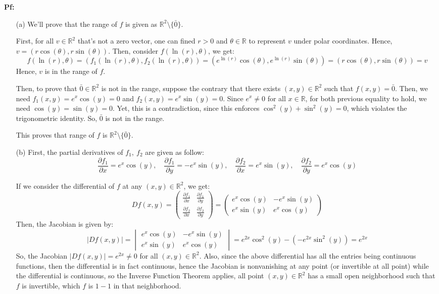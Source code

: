 \documentclass{article}
\begin{document}
\textbf{Pf:}
\begin{itemize}
    \item[(a)] We'll prove that the range of $f$ is given as $\mathbb{R}^2\setminus\{\bar{0}\}$.
    
    First, for all $v\in\mathbb{R}^2$ that's not a zero vector, one can fined $r>0$ and $\theta\in\mathbb{R}$ to represent $v$ under polar coordinates.
    Hence, $v = (r\cos(\theta),r\sin(\theta))$. Then, consider $f(\ln(r),\theta)$, we get:
    $$f(\ln(r),\theta)=\left(f_1(\ln(r),\theta),f_2(\ln(r),\theta)\right) = (e^{\ln(r)}\cos(\theta),e^{\ln(r)}\sin(\theta)) = (r\cos(\theta),r\sin(\theta))=v$$
    Hence, $v$ is in the range of $f$.

    Then, to prove that $\bar{0}\in \mathbb{R}^2$ is not in the range, suppose the contrary that there exists $(x,y)\in\mathbb{R}^2$ such that $f(x,y)=\bar{0}$.
    Then, we need $f_1(x,y)=e^x\cos(y)=0$ and $f_2(x,y)=e^x\sin(y)=0$.
    Since $e^x\neq 0$ for all $x\in\mathbb{R}$, for both previous equality to hold, we need $\cos(y)=\sin(y)=0$. Yet, this is a contradiction, since this enforces $\cos^2(y)+\sin^2(y)=0$,
    which violates the trigonometric identity. So, $\bar{0}$ is not in the range.

    This proves that range of $f$ is $\mathbb{R}^2\setminus\{\bar{0}\}$.

    \hfil

    \item[(b)] First, the partial derivatives of $f_1,\ f_2$ are given as follow:
    $$\frac{\partial f_1}{\partial x} = e^x\cos(y),\quad \frac{\partial f_1}{\partial y}=-e^x\sin(y),\quad \frac{\partial f_2}{\partial x}=e^x\sin(y),\quad \frac{\partial f_2}{\partial y}=e^x\cos(y)$$
    
    If we consider the differential of $f$ at any $(x,y)\in\mathbb{R}^2$, we get:
    $$Df(x,y) = \begin{pmatrix}
        \frac{\partial f_1}{\partial x} & \frac{\partial f_1}{\partial y}\\
        \frac{\partial f_2}{\partial x} & \frac{\partial f_2}{\partial y}
    \end{pmatrix} = \begin{pmatrix}
        e^x\cos(y) & -e^x\sin(y)\\
        e^x\sin(y) & e^x\cos(y)
    \end{pmatrix}$$
    Then, the Jacobian is given by:
    $$|Df(x,y)| = \begin{vmatrix}
        e^x\cos(y) & -e^x\sin(y)\\
        e^x\sin(y) & e^x\cos(y)
    \end{vmatrix} = e^{2x}\cos^2(y) - (-e^{2x}\sin^2(y)) = e^{2x}$$
    So, the Jacobian $|Df(x,y)|=e^{2x}\neq 0$ for all $(x,y)\in\mathbb{R}^2$. Also, since the above differential has all the entries being continuous functions,
    then the differential is in fact continuous, hence the Jacobian is nonvanishing at any point (or invertible at all point) while the differential is continuous,
    so the Inverse Function Theorem applies, all point $(x,y)\in\mathbb{R}^2$ has a small open neighborhood such that $f$ is invertible, which $f$ is $1-1$ in that neighborhood.


\end{itemize}
\end{document}

